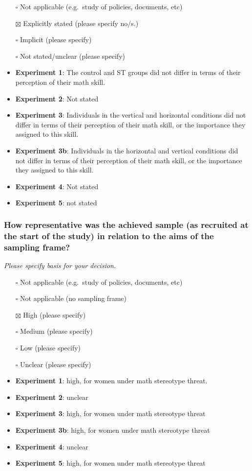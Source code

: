 \documentclass[
  doc, a4paper]{apa7}
\begin{document}
\begin{itemize}
\item[$\square$]
  Not applicable (e.g.~study of policies, documents, etc)
\item[$\boxtimes$]
  Explicitly stated (please specify no/s.)
\item[$\square$]
  Implicit (please specify)
\item[$\square$]
  Not stated/unclear (please specify)
\item
  \textbf{Experiment 1}: The control and ST groups did not differ in terms of their perception of their math skill.\\
\item
  \textbf{Experiment 2}: Not stated
\item
  \textbf{Experiment 3}: Individuals in the vertical and horizontal conditions did not differ in terms of their perception of their math skill, or the importance they assigned to this skill.
\item
  \textbf{Experiment 3b}: Individuals in the horizontal and vertical conditions did not differ in terms of their perception of their math skill, or the importance they assigned to this skill.
\item
  \textbf{Experiment 4}: Not stated
\item
  \textbf{Experiment 5}: not stated
\end{itemize}

\subsubsection{How representative was the achieved sample (as recruited at the start of the study) in relation to the aims of the sampling frame?}\label{how-representative-was-the-achieved-sample-as-recruited-at-the-start-of-the-study-in-relation-to-the-aims-of-the-sampling-frame}

\emph{Please specify basis for your decision.}

\begin{itemize}
\item[$\square$]
  Not applicable (e.g.~study of policies, documents, etc)
\item[$\square$]
  Not applicable (no sampling frame)
\item[$\boxtimes$]
  High (please specify)
\item[$\square$]
  Medium (please specify)
\item[$\square$]
  Low (please specify)
\item[$\square$]
  Unclear (please specify)
\item
  \textbf{Experiment 1}: high, for women under math stereotype threat.\\
\item
  \textbf{Experiment 2}: unclear
\item
  \textbf{Experiment 3}: high, for women under math stereotype threat
\item
  \textbf{Experiment 3b}: high, for women under math stereotype threat
\item
  \textbf{Experiment 4}: unclear
\item
  \textbf{Experiment 5}: high, for women under math stereotype threat
\end{itemize}
\end{document}
